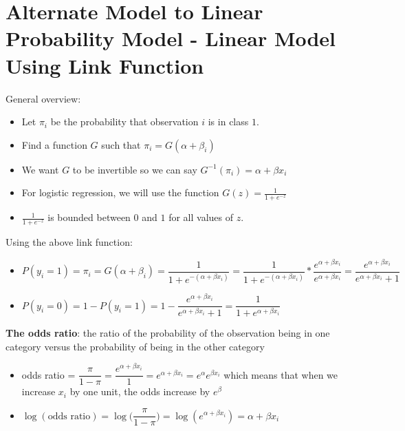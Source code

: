 \documentclass[12pt,timesnewroman,letterpaper]{article}
\begin{document}
\section{Alternate Model to Linear Probability Model - Linear Model Using Link Function}


General overview:
\begin{itemize}
    \item Let $\pi_i$ be the probability that observation $i$ is in class $1$.
    \item Find a function $G$ such that $\pi_i = G(\alpha + \beta_i)$
    \item We want $G$ to be invertible so we can say $G^{-1}(\pi_i) = \alpha + \beta x_i$
    \item For logistic regression, we will use the function $G(z) = \frac{1}{1+e^{-z}}$
    \item $\frac{1}{1+e^{-z}}$ is bounded between $0$ and $1$ for all values of $z$.
\end{itemize}

\noindent Using the above link function:
\begin{itemize}
    

\item $P(y_i = 1) = \pi_i = G(\alpha + \beta_i) = \dfrac{1}{1 + e^{-(\alpha + \beta x_i)}}  = \dfrac{1}{1 + e^{-(\alpha + \beta x_i)}} * \dfrac{e^{\alpha + \beta x_i}}{e^{\alpha + \beta x_i}} = \dfrac{e^{\alpha + \beta x_i}}{e^{\alpha + \beta x_i} + 1}$
\item $P(y_i = 0) = 1 - P(y_i = 1) = 1 - \dfrac{e^{\alpha + \beta x_i}}{e^{\alpha + \beta x_i} + 1} = \dfrac{1}{1 + e^{\alpha + \beta x_i}}$

\end{itemize}

\noindent \textbf{The odds ratio}: the ratio of the probability of the observation being in one category versus the probability of being in the other category
\begin{itemize}
    
\item odds ratio = $\dfrac{\pi}{1-\pi} = \dfrac{e^{\alpha + \beta x_i}}{1} = e^{\alpha + \beta x_i} = e^{\alpha}e^{\beta x_i}$ which means that when we increase $x_i$ by one unit, the odds increase by $e^{\beta}$

\item $\log(\text{odds ratio}) = \log\big(\dfrac{\pi}{1-\pi}\big) = \log(e^{\alpha + \beta x_i}) = \alpha + \beta x_i$
\end{itemize}
\end{document}
